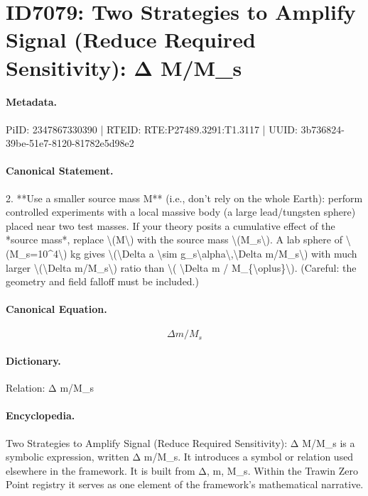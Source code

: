 \section*{ID7079: Two Strategies to Amplify Signal (Reduce Required Sensitivity): Δ M/M\_s}
\paragraph{Metadata.}
PiID: 2347867330390 | RTEID: RTE:P27489.3291:T1.3117 | UUID: 3b736824-39be-51e7-8120-81782e5d98e2

\paragraph{Canonical Statement.}
2. **Use a smaller source mass M** (i.e., don’t rely on the whole Earth): perform controlled experiments with a local massive body (a large lead/tungsten sphere) placed near two test masses. If your theory posits a cumulative effect of the *source mass*, replace \textbackslash{}(M\textbackslash{}) with the source mass \textbackslash{}(M\_s\textbackslash{}). A lab sphere of \textbackslash{}(M\_s=10\textasciicircum{}4\textbackslash{}) kg gives \textbackslash{}(\textbackslash{}Delta a \textbackslash{}sim g\_s\textbackslash{}alpha\textbackslash{},\textbackslash{}Delta m/M\_s\textbackslash{}) with much larger \textbackslash{}(\textbackslash{}Delta m/M\_s\textbackslash{}) ratio than \textbackslash{}( \textbackslash{}Delta m / M\_\{\textbackslash{}oplus\}\textbackslash{}). (Careful: the geometry and field falloff must be included.)

\paragraph{Canonical Equation.}
\[
\Delta m/M_s
\]

\paragraph{Dictionary.}
Relation: Δ m/M\_s

\paragraph{Encyclopedia.}
Two Strategies to Amplify Signal (Reduce Required Sensitivity): Δ M/M\_s is a symbolic expression, written Δ m/M\_s. It introduces a symbol or relation used elsewhere in the framework. It is built from Δ, m, M\_s. Within the Trawin Zero Point registry it serves as one element of the framework's mathematical narrative.

